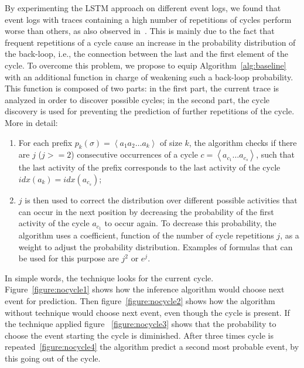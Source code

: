 By experimenting the LSTM approach on different event logs, we found that event logs with traces containing a high number of repetitions of cycles perform worse than others, as also observed in~\cite{niek96732}. This is mainly due to the fact that frequent repetitions of a cycle cause an increase in the probability distribution of the back-loop, i.e., the connection between the last and the first element of the cycle.
To overcome this problem, we propose to equip Algorithm~\ref{alg:baseline} with an additional function in charge of weakening such a back-loop probability. This function is composed of two parts: in the first part, the current trace is analyzed in order to discover possible cycles; in the second part, the cycle discovery is used for preventing the prediction of further repetitions of the cycle. %
More in detail:
\begin{enumerate}
\item For each prefix $p_k(\sigma)=\left\langle a_1a_2 \ldots a_k\right\rangle$ of size $k$, the algorithm checks if there are $j$ ($j>=2$) consecutive occurrences of a cycle $c=\left\langle a_{c_1}\ldots a_{c_s}\right\rangle$, such that the last activity of the prefix corresponds to the last activity of the cycle $idx(a_k)=idx(a_{c_s})$;
\item $j$ is then used to correct the distribution over different possible activities that can occur in the next position by decreasing the probability of the first activity of the cycle $a_{c_1}$ to occur again. To decrease this probability, the algorithm uses a coefficient, function of the number of cycle repetitions $j$, as a weight to adjust the probability distribution. Examples of formulas that can be used for this purpose are $j^{2}$ or $e^{j}$.
\end{enumerate}

In simple words, the \nocycle technique looks for the current cycle. Figure~\ref{figure:nocycle1} shows how the inference algorithm would choose next event for prediction. Then figure~\ref{figure:nocycle2} shows how the algorithm without \nocycle technique would choose next event, even though the cycle is present. If the technique applied figure ~\ref{figure:nocycle3} shows that the probability to choose the event starting the cycle is diminished. After three times cycle is repeated~\ref{figure:nocycle4} the algorithm predict a second most probable event, by this going out of the cycle.




